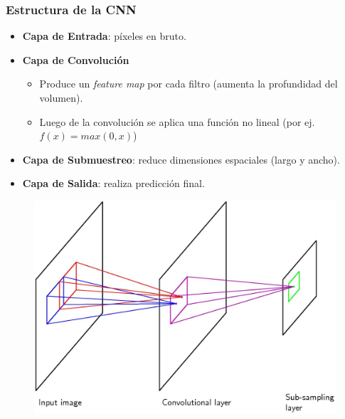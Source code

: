 \documentclass[10pt,center]{beamer}
\begin{document}
\begin{frame}
  \frametitle{Estructura de la CNN}
    \begin{itemize}
     \item \textbf{Capa de Entrada}: píxeles en bruto.
     \item \textbf{Capa de Convolución}
     \begin{itemize}
      \item Produce un \textit{feature map} por cada filtro (aumenta la profundidad del volumen).
      \item Luego de la convolución se aplica una función no lineal (por ej. $f(x) = max(0,x)$)
     \end{itemize}
     \item \textbf{Capa de Submuestreo}: reduce dimensiones espaciales (largo y ancho).
     \item \textbf{Capa de Salida}: realiza predicción final. 
    \end{itemize}
  \begin{figure}[h]
  \captionsetup[subfigure]{labelformat=empty}
    \begin{center}
    \includegraphics[height=0.45\textheight]{./img/bishop_cnn.jpg}
    \end{center}
  \end{figure}
\end{frame}
\end{document}
